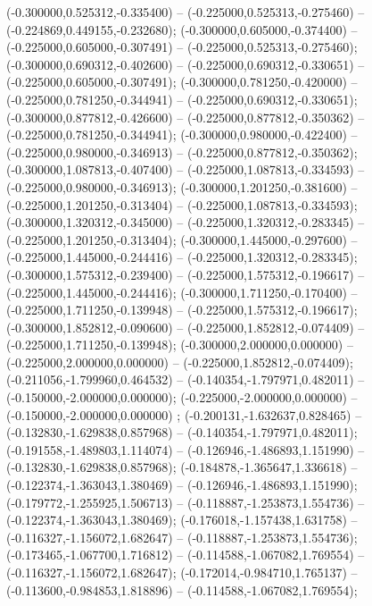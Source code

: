  (-0.300000,0.525312,-0.335400) -- (-0.225000,0.525313,-0.275460) -- (-0.224869,0.449155,-0.232680);
 (-0.300000,0.605000,-0.374400) -- (-0.225000,0.605000,-0.307491) -- (-0.225000,0.525313,-0.275460);
 (-0.300000,0.690312,-0.402600) -- (-0.225000,0.690312,-0.330651) -- (-0.225000,0.605000,-0.307491);
 (-0.300000,0.781250,-0.420000) -- (-0.225000,0.781250,-0.344941) -- (-0.225000,0.690312,-0.330651);
 (-0.300000,0.877812,-0.426600) -- (-0.225000,0.877812,-0.350362) -- (-0.225000,0.781250,-0.344941);
 (-0.300000,0.980000,-0.422400) -- (-0.225000,0.980000,-0.346913) -- (-0.225000,0.877812,-0.350362);
 (-0.300000,1.087813,-0.407400) -- (-0.225000,1.087813,-0.334593) -- (-0.225000,0.980000,-0.346913);
 (-0.300000,1.201250,-0.381600) -- (-0.225000,1.201250,-0.313404) -- (-0.225000,1.087813,-0.334593);
 (-0.300000,1.320312,-0.345000) -- (-0.225000,1.320312,-0.283345) -- (-0.225000,1.201250,-0.313404);
 (-0.300000,1.445000,-0.297600) -- (-0.225000,1.445000,-0.244416) -- (-0.225000,1.320312,-0.283345);
 (-0.300000,1.575312,-0.239400) -- (-0.225000,1.575312,-0.196617) -- (-0.225000,1.445000,-0.244416);
 (-0.300000,1.711250,-0.170400) -- (-0.225000,1.711250,-0.139948) -- (-0.225000,1.575312,-0.196617);
 (-0.300000,1.852812,-0.090600) -- (-0.225000,1.852812,-0.074409) -- (-0.225000,1.711250,-0.139948);
 (-0.300000,2.000000,0.000000) -- (-0.225000,2.000000,0.000000) -- (-0.225000,1.852812,-0.074409);
 (-0.211056,-1.799960,0.464532) -- (-0.140354,-1.797971,0.482011) -- (-0.150000,-2.000000,0.000000);
 (-0.225000,-2.000000,0.000000) -- (-0.150000,-2.000000,0.000000) ;
 (-0.200131,-1.632637,0.828465) -- (-0.132830,-1.629838,0.857968) -- (-0.140354,-1.797971,0.482011);
 (-0.191558,-1.489803,1.114074) -- (-0.126946,-1.486893,1.151990) -- (-0.132830,-1.629838,0.857968);
 (-0.184878,-1.365647,1.336618) -- (-0.122374,-1.363043,1.380469) -- (-0.126946,-1.486893,1.151990);
 (-0.179772,-1.255925,1.506713) -- (-0.118887,-1.253873,1.554736) -- (-0.122374,-1.363043,1.380469);
 (-0.176018,-1.157438,1.631758) -- (-0.116327,-1.156072,1.682647) -- (-0.118887,-1.253873,1.554736);
 (-0.173465,-1.067700,1.716812) -- (-0.114588,-1.067082,1.769554) -- (-0.116327,-1.156072,1.682647);
 (-0.172014,-0.984710,1.765137) -- (-0.113600,-0.984853,1.818896) -- (-0.114588,-1.067082,1.769554);
